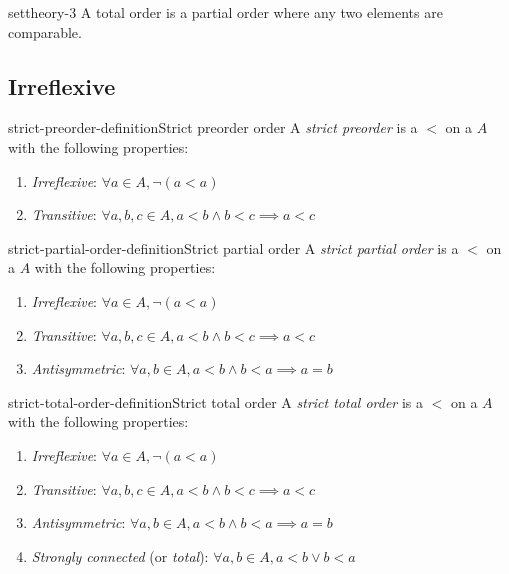 \documentclass[preview]{standalone}
\begin{document}
\begin{snippet}{settheory-3}
    A total order is a partial order where any two elements are comparable.
\end{snippet}

\subsection{Irreflexive}

\begin{snippetdefinition}{strict-preorder-definition}{Strict preorder order}
    A \textit{strict preorder} is a \homrelation \(<\) on a \set \(A\)
    with the following properties:
    \begin{enumerate}
        \item \textit{Irreflexive}: \(\forall a \in A, \lnot (a < a)\)
        \item \textit{Transitive}: \(\forall a,b,c \in A, a < b \land b < c \implies a < c\)
    \end{enumerate}
\end{snippetdefinition}

\begin{snippetdefinition}{strict-partial-order-definition}{Strict partial order}
    A \textit{strict partial order} is a \homrelation \(<\) on a \set \(A\)
    with the following properties:
    \begin{enumerate}
        \item \textit{Irreflexive}: \(\forall a \in A, \lnot (a < a)\)
        \item \textit{Transitive}: \(\forall a,b,c \in A, a < b \land b < c \implies a < c\)
        \item \textit{Antisymmetric}: \(\forall a,b \in A, a < b \land b < a \implies a=b\)
    \end{enumerate}
\end{snippetdefinition}

\begin{snippetdefinition}{strict-total-order-definition}{Strict total order}
    A \textit{strict total order} is a \homrelation \(<\) on a \set \(A\)
    with the following properties:
    
    \begin{enumerate}
        \item \textit{Irreflexive}: \(\forall a \in A, \lnot (a < a)\)
        \item \textit{Transitive}: \(\forall a,b,c \in A, a < b \land b < c \implies a < c\)
        \item \textit{Antisymmetric}: \(\forall a,b \in A, a < b \land b < a \implies a=b\)
        \item \textit{Strongly connected} (or \textit{total}): \(\forall a,b\in A, a < b \lor b < a\)
    \end{enumerate}
\end{snippetdefinition}
\end{document}
